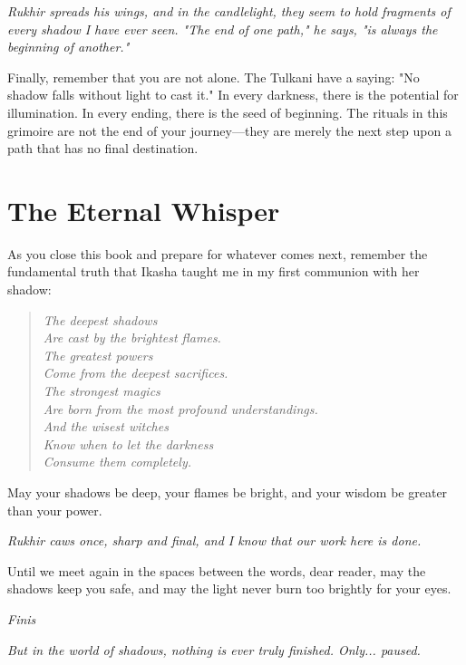 \documentclass[12pt,twoside]{book}
\newcommand{\shadow}[1]{\textit{#1}}
\begin{document}
\shadow{Rukhir spreads his wings, and in the candlelight, they seem to hold fragments of every shadow I have ever seen. "The end of one path," he says, "is always the beginning of another."}

Finally, remember that you are not alone. The Tulkani have a saying: "No shadow falls without light to cast it." In every darkness, there is the potential for illumination. In every ending, there is the seed of beginning. The rituals in this grimoire are not the end of your journey—they are merely the next step upon a path that has no final destination.

\section*{The Eternal Whisper}

As you close this book and prepare for whatever comes next, remember the fundamental truth that Ikasha taught me in my first communion with her shadow:

\begin{verse}
\textit{The deepest shadows} \\
\textit{Are cast by the brightest flames.} \\
\textit{The greatest powers} \\
\textit{Come from the deepest sacrifices.} \\
\textit{The strongest magics} \\
\textit{Are born from the most profound understandings.} \\
\textit{And the wisest witches} \\
\textit{Know when to let the darkness} \\
\textit{Consume them completely.}
\end{verse}

May your shadows be deep, your flames be bright, and your wisdom be greater than your power.

\shadow{Rukhir caws once, sharp and final, and I know that our work here is done.}

Until we meet again in the spaces between the words, dear reader, may the shadows keep you safe, and may the light never burn too brightly for your eyes.

\begin{center}
\textit{Finis}
\end{center}

\shadow{But in the world of shadows, nothing is ever truly finished. Only... paused.}
\end{document}
